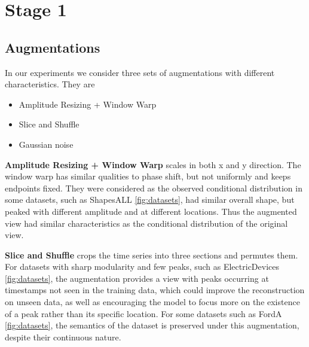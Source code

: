 \documentclass[../../thesis.tex]{subfiles}
\begin{document}

\section{Stage 1}

\subsection{Augmentations}

In our experiments we consider three sets of augmentations with different characteristics. They are
\begin{itemize}
    \item Amplitude Resizing + Window Warp
    \item Slice and Shuffle
    \item Gaussian noise
\end{itemize}

\textbf{Amplitude Resizing + Window Warp} scales in both x and y direction. The window warp has similar qualities to phase shift, but not uniformly and keeps endpoints fixed. They were considered as the observed conditional distribution in some datasets, such as ShapesALL \ref{fig:datasets}, had similar overall shape, but peaked with different amplitude and at different locations. Thus the augmented view had similar characteristics as the conditional distribution of the original view. \newline

\textbf{Slice and Shuffle} crops the time series into three sections and permutes them. For datasets with sharp modularity and few peaks, such as ElectricDevices \ref{fig:datasets}, the augmentation provides a view with peaks occurring at timestamps not seen in the training data, which could improve the reconstruction on unseen data, as well as encouraging the model to focus more on the existence of a peak rather than its specific location. For some datasets such as FordA \ref{fig:datasets}, the semantics of the dataset is preserved under this augmentation, despite their continuous nature.\newline
\end{document}
